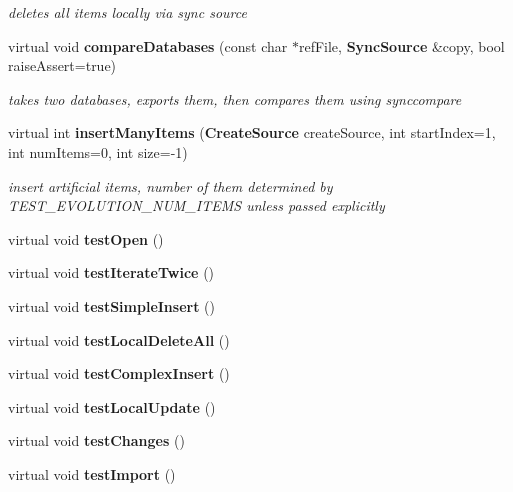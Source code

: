 \begin{CompactItemize}
\begin{CompactList}\small\item\em deletes all items locally via sync source \item\end{CompactList}\item 
virtual void {\bf compare\-Databases} (const char $\ast$ref\-File, {\bf Sync\-Source} \&copy, bool raise\-Assert=true)
\begin{CompactList}\small\item\em takes two databases, exports them, then compares them using synccompare \item\end{CompactList}\item 
virtual int {\bf insert\-Many\-Items} ({\bf Create\-Source} create\-Source, int start\-Index=1, int num\-Items=0, int size=-1)
\begin{CompactList}\small\item\em insert artificial items, number of them determined by TEST\_\-EVOLUTION\_\-NUM\_\-ITEMS unless passed explicitly \item\end{CompactList}\item 
virtual void \textbf{test\-Open} ()\label{group__ClientTest_g86523e51eeb7f4b2f9af40483952a13d}

\item 
virtual void \textbf{test\-Iterate\-Twice} ()\label{group__ClientTest_ge859169c3e1f1306be4b7fdb74635c08}

\item 
virtual void \textbf{test\-Simple\-Insert} ()\label{group__ClientTest_g4f6150f962c87e26e04462237471eb59}

\item 
virtual void \textbf{test\-Local\-Delete\-All} ()\label{group__ClientTest_g51dc0792ddba8ef6edafa0cf14b9e0fa}

\item 
virtual void \textbf{test\-Complex\-Insert} ()\label{group__ClientTest_g33765a5f9ea2b98b9f5db89e45275603}

\item 
virtual void \textbf{test\-Local\-Update} ()\label{group__ClientTest_gfe4acc8d97f4c4511b07f1283254aecc}

\item 
virtual void \textbf{test\-Changes} ()\label{group__ClientTest_g9eafd5c7f66ec1a01130fe906bf4fbf4}

\item 
virtual void \textbf{test\-Import} ()\label{group__ClientTest_g18af29fdc3e8816478d535fc80809ed2}


\end{CompactItemize}
